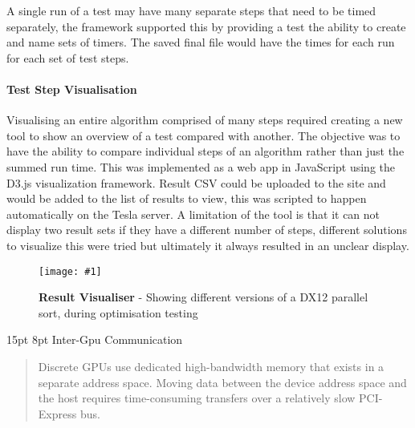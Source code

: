 \documentclass[12pt,a4paper]{article}
\makeatletter
\newcommand{\figuremacroWHH}[4]{
	\begin{figure}[H] %
		\centering
		\texttt{[image: \#1]}
		\caption[#2]{\textbf{#2} - #3}
		\label{fig:#1}
	\end{figure}
}
\renewcommand\subsection{\@startsection {subsection}{1}{2mm} %
                               {15pt} %
                               {8pt} %
                               {\fontsize{13pt}{1em}\bfseries}}
\makeatother
\begin{document}
A single run of a test may have many separate steps that need to be timed separately, the framework supported this by providing a test the ability to create and name sets of timers. The saved final file would have the times for each run for each set of test steps. 

\paragraph{Test Step Visualisation}
Visualising an entire algorithm comprised of many steps required creating a new tool to show an overview of a test compared with another. The objective was to have the ability to compare individual steps of an algorithm rather than just the summed run time. This was implemented as a web app in JavaScript using the D3.js visualization framework. Result CSV could be uploaded to the site and would be added to the list of results to view, this was scripted to happen automatically on the Tesla server.
A limitation of the tool is that it can not display two result sets if they have a different number of steps, different solutions to visualize this were tried but ultimately it always resulted in an unclear display. 

\figuremacroWHH
{resvisdx12}
{Result Visualiser}
{Showing different versions of a DX12 parallel sort, during optimisation testing}
{1.0}


\subsection{Inter-Gpu Communication}
\blockquote[\cite{amdoclguide}]{Discrete GPUs use dedicated high-bandwidth memory that exists in a separate address space. Moving data between the device address space and the host requires time-consuming transfers over a relatively slow PCI-Express bus.
}
\end{document}
